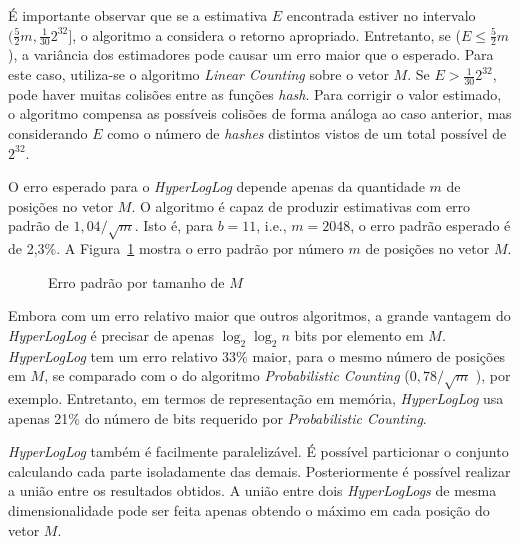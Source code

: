 É importante observar que se a estimativa $E$ encontrada estiver no intervalo $(\frac{5}{2}m, \frac{1}{30}2^{32}]$, o algoritmo a considera o retorno apropriado. Entretanto, se ($E \leq \frac{5}{2}m$), a variância dos estimadores pode causar um erro maior que o esperado. Para este caso, utiliza-se o algoritmo \emph{Linear Counting} \cite{whang1990linear} sobre o vetor $M$. Se $E > \frac{1}{30}2^{32}$, pode haver muitas colisões entre as funções \emph{hash}. Para corrigir o valor estimado, o algoritmo compensa as possíveis colisões de forma análoga ao caso anterior, mas considerando $E$ como o número de \emph{hashes} distintos vistos de um total possível de $2^{32}$.

O erro esperado para o \emph{HyperLogLog} depende apenas da quantidade $m$ de posições no vetor $M$. O algoritmo é capaz de produzir estimativas com erro padrão de $1,04/\sqrt{m}$. Isto é, para $b=11$, i.e., $m=2048$, o erro padrão esperado é de 2,3\%. A Figura~\ref{fig:hll:proberr} mostra o erro padrão por número $m$ de posições no vetor $M$.

\begin{figure}[!htbp]
\centering
{}
\caption{Erro padrão por tamanho de $M$}
\label{fig:hll:proberr}
\end{figure}

Embora com um erro relativo maior que outros algoritmos, a grande vantagem do \emph{HyperLogLog} é precisar de apenas $\log_2 \log_2 n$ bits por elemento em $M$. \emph{HyperLogLog} tem um erro relativo 33\% maior, para o mesmo número de posições em $M$, se comparado com o do algoritmo \emph{Probabilistic Counting} ($0,78 / \sqrt{m}$ \cite{flajolet1985probabilistic}), por exemplo. Entretanto, em termos de representação em memória, \emph{HyperLogLog} usa apenas 21\% do número de bits requerido por \emph{Probabilistic Counting}.

\emph{HyperLogLog} também é facilmente paralelizável. É possível particionar o conjunto calculando cada parte isoladamente das demais. Posteriormente é possível realizar a união entre os resultados obtidos. A união entre dois \emph{HyperLogLogs} de mesma dimensionalidade pode ser feita apenas obtendo o máximo em cada posição do vetor $M$.

